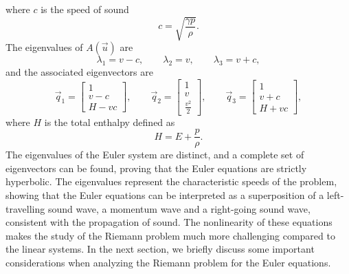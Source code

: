 where $c$ is the speed of sound
\begin{equation}
	c = \sqrt{\frac{\gamma p}{\rho}}.
\end{equation}
The eigenvalues of $A(\vec u)$ are 
\begin{equation}
	\lambda_1 = v - c, \quad\quad \lambda_2 = v, \quad\quad \lambda_3 = v + c,
\end{equation}
and the associated eigenvectors are 
\begin{equation}
	\vec q_1 = \begin{bmatrix}
		1 \\ v - c \\ H - vc
	\end{bmatrix},
	\quad\quad
	\vec q_2 = \begin{bmatrix}
		1 \\ v \\ \frac{v^2}{2}
	\end{bmatrix},
	\quad\quad
	\vec q_3 = \begin{bmatrix}
		1 \\ v + c \\ H + vc
	\end{bmatrix},
\end{equation}
where $H$ is the total enthalpy defined as
\begin{equation}
	H = E + \frac{p}{\rho}.
\end{equation} 
The eigenvalues of the Euler system are distinct, and a complete set of eigenvectors can be found, proving that the Euler equations are strictly hyperbolic. The eigenvalues represent the characteristic speeds of the problem,  showing that the Euler equations can be interpreted as a superposition of a left-travelling sound wave, a momentum wave and a right-going sound wave, consistent with the propagation of sound. The nonlinearity of these equations makes the study of the Riemann problem much more challenging compared to the linear systems. In the next section, we briefly discuss some important considerations when analyzing the Riemann problem for the Euler equations.

